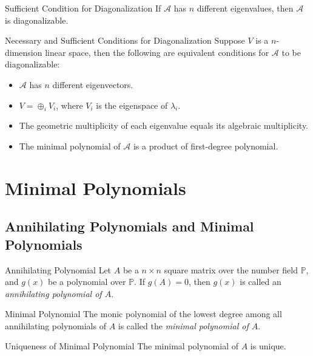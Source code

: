 \begin{proposition}{Sufficient Condition for Diagonalization}{}
  If $\mathcal{A}$ has $n$ different eigenvalues,
  then $\mathcal{A}$ is diagonalizable.
\end{proposition}

\begin{proposition}{Necessary and Sufficient Conditions for Diagonalization}{}
  Suppose $V$ is a $n$-dimension linear space,
  then the following are equivalent conditions for $\mathcal{A}$ to be diagonalizable:
  \begin{itemize}
  \item $\mathcal{A}$ has $n$ different eigenvectors.
  \item $V = \oplus_i V_i$, where $V_i$ is the eigenspace of $\lambda_i$.
  \item The geometric multiplicity of each eigenvalue equals its algebraic multiplicity.
  \item The minimal polynomial of $\mathcal{A}$ is a product of first-degree polynomial.
  \end{itemize}
\end{proposition}

\section{Minimal Polynomials}

\subsection{Annihilating Polynomials and Minimal Polynomials}

\begin{definition}{Annihilating Polynomial}{}
  Let $A$ be a $n\times n$ square matrix over the number field $\mathbb{P}$,
  and $g(x)$ be a polynomial over $\mathbb{P}$.
  If $g(A) = 0$, then $g(x)$ is called an \emph{annihilating polynomial of $A$}.
\end{definition}

\begin{definition}{Minimal Polynomial}{}
  The monic polynomial of the lowest degree among all annihilating polynomials
  of $A$ is called the \emph{minimal polynomial of $A$}.
\end{definition}

\begin{proposition}{Uniqueness of Minimal Polynomial}{}
  The minimal polynomial of $A$ is unique.
\end{proposition}

